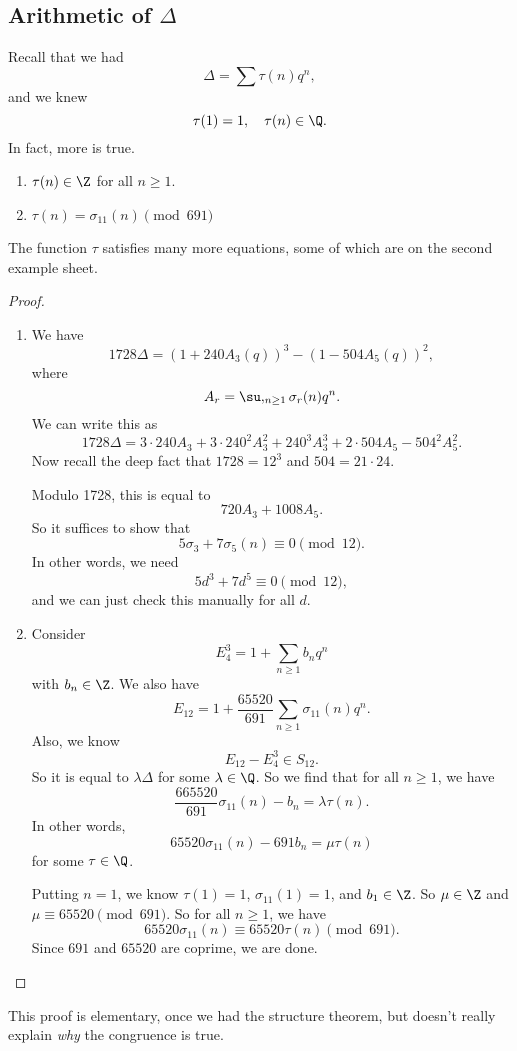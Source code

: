 \documentclass[a4paper]{article}
\begin{document}
\newpage
\subsection{Arithmetic of $\Delta$}
Recall that we had
\[
  \Delta = \sum \tau(n) q^n,
\]
and we knew
\[
  \tau(1) = 1,\quad \tau(n) \in \Q.
\]
In fact, more is true.
\begin{prop}\leavevmode
  \begin{enumerate}
    \item $\tau(n) \in \Z$ for all $n \geq 1$.
    \item $\tau(n) = \sigma_{11}(n) \pmod {691}$
  \end{enumerate}
\end{prop}
The function $\tau$ satisfies many more equations, some of which are on the second example sheet.

\begin{proof}
  \begin{enumerate}
    \item We have
      \[
        1728 \Delta = (1 + 240 A_3(q))^3 - (1 - 504 A_5 (q))^2,
      \]
      where
      \[
        A_r = \su,_{n \geq 1} \sigma_r(n) q^n.
      \]
      We can write this as
      \[
         1728\Delta = 3\cdot 240 A_3 + 3\cdot 240^2 A_3^2 + 240^3 A_3^3 + 2\cdot 504 A_5 - 504^2 A_5^2.
      \]
      Now recall the deep fact that $1728 = 12^3$ and $504 = 21 \cdot 24$.

      Modulo 1728, this is equal to
      \[
        720 A_3 + 1008 A_5.
      \]
      So it suffices to show that
      \[
        5 \sigma_3 + 7 \sigma_5(n) \equiv 0 \pmod 12.
      \]
      In other words, we need
      \[
        5 d^3 + 7 d^5 \equiv 0 \pmod 12,
      \]
      and we can just check this manually for all $d$.
    \item Consider
      \[
        E_4^3 = 1 + \sum_{n \geq 1} b_n q^n
      \]
      with $b_n \in \Z$. We also have
      \[
        E_{12} = 1 + \frac{65520}{691} \sum_{n \geq 1} \sigma_{11}(n) q^n.
      \]
      Also, we know
      \[
        E_{12} - E_4^3 \in S_{12}.
      \]
      So it is equal to $\lambda \Delta$ for some $\lambda \in \Q$. So we find that for all $n \geq 1$, we have
      \[
        \frac{665520}{691} \sigma_{11}(n) - b_n = \lambda \tau(n).
      \]
      In other words,
      \[
        65520 \sigma_{11}(n) - 691 b_n = \mu \tau(n)
      \]
      for some $\tau \in \Q$.

      Putting $n = 1$, we know $\tau(1) = 1$, $\sigma_{11}(1) = 1$, and $b_1 \in \Z$. So $\mu \in \Z$ and $\mu \equiv 65520 \pmod 691$. So for all $n \geq 1$, we have
      \[
        65520 \sigma_{11}(n) \equiv 65520 \tau(n) \pmod 691.
      \]
      Since $691$ and $65520$ are coprime, we are done.
  \end{enumerate}
\end{proof}
This proof is elementary, once we had the structure theorem, but doesn't really explain \emph{why} the congruence is true.
\end{document}
